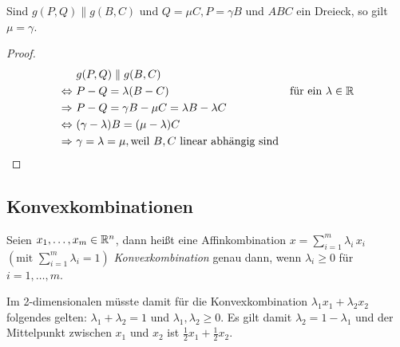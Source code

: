 \begin{thm}
	Sind $g(P,Q) \parallel g(B,C)$ und $Q = \mu C, P = \gamma B$ und $ABC$ ein Dreieck, so gilt $\mu
	= \gamma$.
	\begin{proof}
		\begin{align*}
			 & g(P,Q) \parallel g(B,C)\\
			\Leftrightarrow \ & P-Q = \lambda(B-C) & \text{für ein } \lambda \in \mathbb R\\
			\Rightarrow \ & P-Q = \gamma B - \mu C = \lambda B - \lambda C\\
			\Leftrightarrow \ & (\gamma - \lambda) B = (\mu - \lambda) C\\
			\Rightarrow \ & \gamma = \lambda = \mu, \text{weil $B,C$ linear abhängig sind}
		\end{align*}
	\end{proof}
\end{thm}


\subsection*{Konvexkombinationen} %
\label{sub:Konvexkombinationen}

\begin{defi}
	Seien $x_1, \dots, x_m \in \mathbb R^n$, dann heißt eine Affinkombination $x = \sum\limits_{i=1}^m
	\lambda_i \, x_i$ $\left( \text{mit } \sum\limits_{i=1}^m \lambda_i = 1 \right)$ {\em
	Konvexkombination} genau dann, wenn $\lambda_i \geq 0$ für $i = 1, \dots, m$.
\end{defi}

Im 2-dimensionalen müsste damit für die Konvexkombination $\lambda_1 x_1 + \lambda_2 x_2$ folgendes
gelten: $\lambda_1 +\lambda_2 = 1$ und $\lambda_1, \lambda_2 \geq 0$. Es gilt damit $\lambda_2 =
1-\lambda_1$ und der Mittelpunkt zwischen $x_1$ und $x_2$ ist $\frac{1}{2} x_1 + \frac{1}{2} x_2$.

